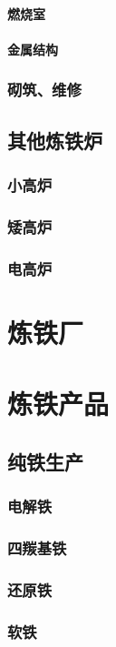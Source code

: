 \documentclass[UTF8]{../../ApplicationUniverse}
\begin{document}
            \paragraph{燃烧室}
            \paragraph{金属结构}
        \subsubsection{砌筑、维修}
    \subsection{其他炼铁炉}
        \subsubsection{小高炉}
        \subsubsection{矮高炉}
        \subsubsection{电高炉}
\section{炼铁厂}
\section{炼铁产品}
    \subsection{纯铁生产}
        \subsubsection{电解铁}
        \subsubsection{四羰基铁}
        \subsubsection{还原铁}
        \subsubsection{软铁}
\end{document}

